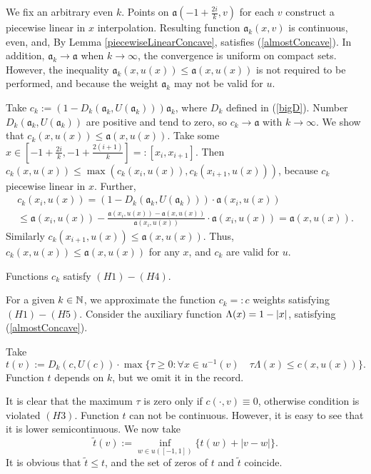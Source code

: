We fix an arbitrary even $k$.
Points on $\mathfrak a(-1 + \frac{2i}{k}, v)$ for each $v$ construct a piecewise linear in $x$ interpolation.
Resulting function $\mathfrak a_k(x, v)$ is continuous, even, and,
By Lemma \ref{piecewiseLinearConcave}, satisfies
(\ref{almostConcave}).
In addition, $\mathfrak a_k \to \mathfrak a$ when $k \to \infty$,
the convergence is uniform on compact sets.
However, the inequality $\mathfrak a_k(x, u(x)) \le \mathfrak a(x, u(x))$ is not required to be performed,
and because the weight $\mathfrak a_k$ may not be valid for $u$.

Take $c_k := (1 - D_k(\mathfrak a_k, U(\mathfrak a_k))) \mathfrak a_k$, where $D_k$ defined in (\ref{bigD}).
Number $D_k(\mathfrak a_k, U(\mathfrak a_k))$ are positive and tend to zero, so $c_k \to \mathfrak a$ with $k \to \infty$.
We show that $c_k(x, u(x)) \le \mathfrak a(x, u(x))$.
Take some
$x \in [-1 + \frac{2i}{k}, -1 + \frac{2(i + 1)}{k}] =: [x_i, x_{i + 1}]$.
Then $c_k(x, u(x)) \le \max( c_k(x_i, u(x)), c_k(x_{i + 1}, u(x)) )$, because
$c_k$ piecewise linear in $x$. Further,
\begin{multline*}
c_k (x_i, u (x)) = ( 1 - D_k (\mathfrak a_k, U (\mathfrak a_k))) \cdot \mathfrak a (x_i, u (x)) \\
\le \mathfrak a (x_i, u (x)) - \frac{\mathfrak a (x_i, u (x)) - \mathfrak a (x, u (x))}{\mathfrak a (x_i, u (x))} \cdot \mathfrak a ( x_i, u (x)) = \mathfrak a (x, u (x)).
\end{multline*}
Similarly $c_k(x_{i + 1}, u(x)) \le \mathfrak a(x, u(x))$.
Thus, $c_k(x, u(x)) \le \mathfrak a(x, u(x))$ for any $x$, and $c_k$ are valid for $u$.

Functions $c_k$ satisfy $(H1)-(H4)$.

For a given $k \in \mathbb N$, we approximate the function $c_k =: c$ weights satisfying $(H1)-(H5)$.
Consider the auxiliary function $\Lambda(x) = 1 - \left\vert x\right\vert$,
satisfying (\ref{almostConcave}).

Take
$$t(v):=D_k(c, U(c)) \cdot \max\{\tau \ge 0: \forall x \in u^{-1}(v) \quad \tau \Lambda(x) \le c(x, u(x))\}.$$
Function $t$ depends on $k$, but we omit it in the record.

It is clear that the maximum $\tau$ is zero only if $c(\cdot, v) \equiv 0$, otherwise condition is violated
$(H3)$.
Function $t$ can not be continuous. However, it is easy to see that it is lower semicontinuous.
We now take
$$\tilde{t}(v) := \inf_{w \in u([-1, 1])} \{t(w) + |v - w|\}.$$
It is obvious that $\tilde{t} \le t$, and the set of zeros of $t$ and $\tilde{t}$ coincide.

